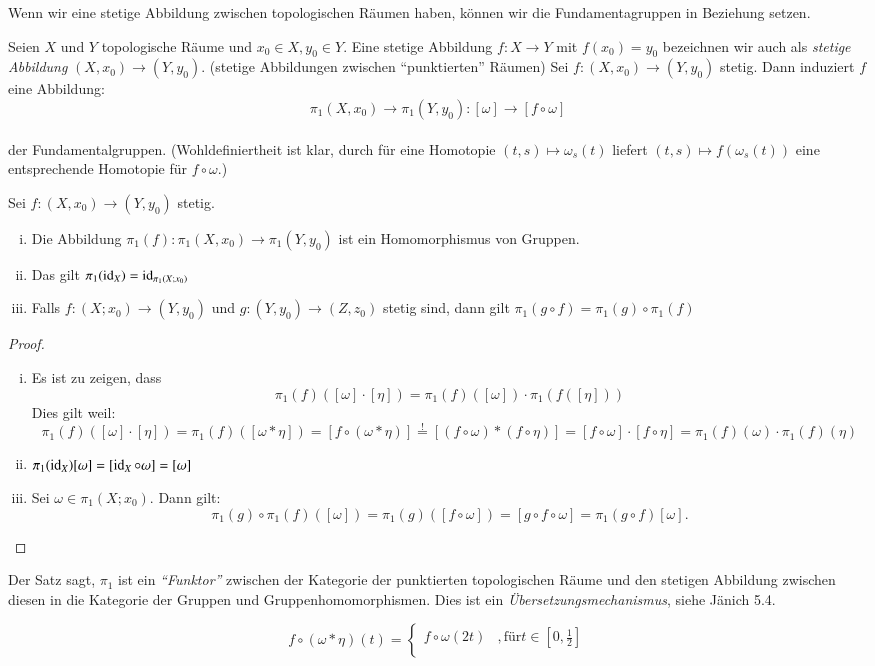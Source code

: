 \documentclass[a4paper,10pt]{scrartcl}
\begin{document}
Wenn wir eine stetige Abbildung zwischen topologischen Räumen haben, können wir die Fundamentagruppen in Beziehung setzen.
\begin{df}
 Seien $X$ und $Y$ topologische Räume und $x_0\in X, y_0 \in Y$. Eine stetige Abbildung $f: X\to Y$ mit $f(x_0)=y_0$ bezeichnen wir auch als \emph{stetige Abbildung} $(X,x_0)\to (Y,y_0)$. (stetige Abbildungen zwischen "`punktierten"' Räumen) Sei $f: (X,x_0) \to (Y,y_0)$ stetig.  Dann induziert $f$ eine Abbildung:
\[
 \pi_1(X,x_0)\to \pi_1(Y,y_0): [\omega] \to [f \circ \omega]
\]
\fixme[fig64]\\
der Fundamentalgruppen. (Wohldefiniertheit ist klar, durch für eine Homotopie $(t,s)\mapsto \omega_s(t)$ liefert $(t,s) \mapsto f(\omega_s(t))$ eine entsprechende Homotopie für $f\circ \omega$.)
\end{df}
\begin{st}
 Sei $f: (X,x_0)\to (Y,y_0)$ stetig.
\begin{enumerate}[(i)]
 \item Die Abbildung $\pi_1(f): \pi_1(X,x_0) \to \pi_1(Y,y_0)$ ist ein Homomorphismus von Gruppen.
 \item Das gilt $\pi_1(\operatorname{id}_X)=\operatorname{id}_{\pi_1(X; x_0)}$
 \item Falls $f:(X;x_0) \to (Y, y_0)$ und $g: (Y, y_0) \to (Z, z_0)$ stetig sind, dann gilt $\pi_1(g\circ f)=\pi_1(g)\circ \pi_1(f)$
\end{enumerate}
\end{st}
\begin{proof}
\begin{enumerate}[(i)]
\item Es ist zu zeigen, dass
\[
 \pi_1(f)([\omega]\cdot [\eta])=\pi_1(f)([\omega])\cdot \pi_1(f([\eta]))
\]
Dies gilt weil: 
$$
\pi_1(f)([\omega]\cdot [\eta])=\pi_1(f)([\omega*\eta])= [f\circ (\omega*\eta)] \stackrel ! = [(f\circ \omega)*(f\circ \eta)]=[f\circ \omega] \cdot [f\circ \eta]=\pi_1(f)(\omega)\cdot \pi_1(f)(\eta)
$$
\item $\pi_1(\operatorname{id}_X)[\omega]=[\operatorname{id}_X\circ \omega]=[\omega]$
\item Sei $\omega\in \pi_1(X;x_0)$. Dann gilt:
\[
 \pi_1(g)\circ \pi_1(f)([\omega])=\pi_1(g)([f\circ \omega])=[g\circ f \circ \omega]=\pi_1(g\circ f) [\omega].
\]
\end{enumerate}
\end{proof}
\begin{note*}
 Der Satz sagt, $\pi_1$ ist ein \emph{"`Funktor"'} zwischen der Kategorie der punktierten topologischen Räume und den stetigen Abbildung zwischen diesen in die Kategorie der Gruppen und Gruppenhomomorphismen. Dies ist ein \emph{Übersetzungsmechanismus}, siehe Jänich 5.4.

\[
 f\circ(\omega*\eta)(t)=\begin{cases} f\circ \omega (2t) &, \text{für} t\in[0,\frac{1}{2}]\\  \end{cases}
\]
\end{note*}
\end{document}
